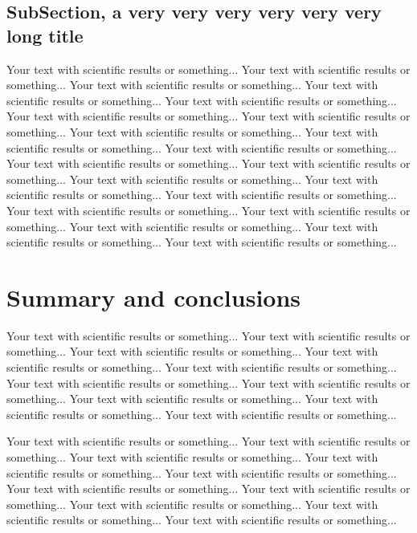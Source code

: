 \documentclass[final]{beamer}
\begin{document}
\begin{frame}[t]
\begin{multicols}{3}
\subsection{SubSection, a very very very very very very long title}

Your text with scientific results or something... 
Your text with scientific results or something... 
Your text with scientific results or something... 
Your text with scientific results or something... 
Your text with scientific results or something... 
Your text with scientific results or something... 
Your text with scientific results or something... 
Your text with scientific results or something... 
Your text with scientific results or something... 
Your text with scientific results or something... 
Your text with scientific results or something... 
Your text with scientific results or something... 
Your text with scientific results or something... 
Your text with scientific results or something... 
Your text with scientific results or something... 
Your text with scientific results or something... 
Your text with scientific results or something... 
Your text with scientific results or something... 
Your text with scientific results or something... 
Your text with scientific results or something...

\section{Summary and conclusions}

Your text with scientific results or something... 
Your text with scientific results or something... 
Your text with scientific results or something... 
Your text with scientific results or something... 
Your text with scientific results or something... 
Your text with scientific results or something... 
Your text with scientific results or something... 
Your text with scientific results or something... 
Your text with scientific results or something... 
Your text with scientific results or something... 

Your text with scientific results or something... 
Your text with scientific results or something... 
Your text with scientific results or something... 
Your text with scientific results or something... 
Your text with scientific results or something... 
Your text with scientific results or something... 
Your text with scientific results or something... 
Your text with scientific results or something... 
Your text with scientific results or something... 
Your text with scientific results or something... 



\end{multicols}
\end{frame}
\end{document}
